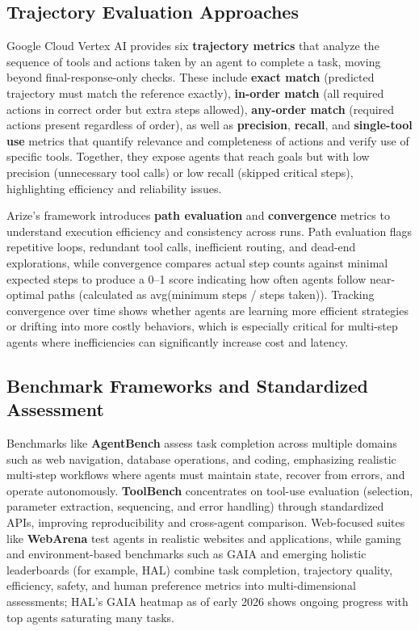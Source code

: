 \begin{TNtwocol}
\subsection*{Trajectory Evaluation Approaches}

Google Cloud Vertex AI provides six \textbf{trajectory metrics} that analyze the sequence of tools and actions taken by an agent to complete a task, moving beyond final-response-only checks. These include \textbf{exact match} (predicted trajectory must match the reference exactly), \textbf{in-order match} (all required actions in correct order but extra steps allowed), \textbf{any-order match} (required actions present regardless of order), as well as \textbf{precision}, \textbf{recall}, and \textbf{single-tool use} metrics that quantify relevance and completeness of actions and verify use of specific tools. Together, they expose agents that reach goals but with low precision (unnecessary tool calls) or low recall (skipped critical steps), highlighting efficiency and reliability issues.
​

Arize’s framework introduces \textbf{path evaluation} and \textbf{convergence} metrics to understand execution efficiency and consistency across runs. Path evaluation flags repetitive loops, redundant tool calls, inefficient routing, and dead-end explorations, while convergence compares actual step counts against minimal expected steps to produce a 0–1 score indicating how often agents follow near-optimal paths (calculated as avg(minimum steps / steps taken)). Tracking convergence over time shows whether agents are learning more efficient strategies or drifting into more costly behaviors, which is especially critical for multi-step agents where inefficiencies can significantly increase cost and latency.

\subsection*{Benchmark Frameworks and Standardized Assessment}

Benchmarks like \textbf{AgentBench} assess task completion across multiple domains such as web navigation, database operations, and coding, emphasizing realistic multi-step workflows where agents must maintain state, recover from errors, and operate autonomously. \textbf{ToolBench} concentrates on tool-use evaluation (selection, parameter extraction, sequencing, and error handling) through standardized APIs, improving reproducibility and cross-agent comparison. Web-focused suites like \textbf{WebArena} test agents in realistic websites and applications, while gaming and environment-based benchmarks such as GAIA and emerging holistic leaderboards (for example, HAL) combine task completion, trajectory quality, efficiency, safety, and human preference metrics into multi-dimensional assessments; HAL's GAIA heatmap as of early 2026 shows ongoing progress with top agents saturating many tasks.


\end{TNtwocol}
